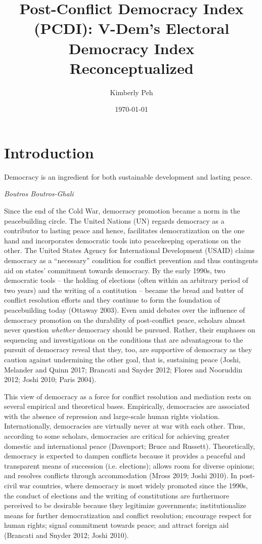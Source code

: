 \documentclass [11pt]{article}
\title{Post-Conflict Democracy Index (PCDI): V-Dem's Electoral Democracy Index Reconceptualized}
\author{Kimberly Peh}
\date{\today}
\begin{document}
\maketitle

\section*{Introduction} 

\epigraph{Democracy is an ingredient for both sustainable development and lasting peace.}{\emph{Boutros Boutros-Ghali}}

Since the end of the Cold War, democracy promotion became a norm in the peacebuilding circle. The United Nations (UN) regards democracy as a contributor to lasting peace and hence, facilitates democratization on the one hand and incorporates democratic tools into peacekeeping operations on the other. The United States Agency for International Development (USAID) claims democracy as a ``necessary'' condition for conflict prevention and thus contingents aid on states' commitment towards democracy. By the early 1990s, two democratic tools -- the holding of elections (often within an arbitrary period of two years) and the writing of a contitution -- became the bread and butter of conflict resolution efforts and they continue to form the foundation of peacebuilding today (Ottaway 2003). Even amid debates over the influence of democracy promotion on the durability of post-conflict peace, scholars almost never question \emph{whether} democracy should be pursued. Rather, their emphases on sequencing and investigations on the conditions that are advantageous to the pursuit of democracy reveal that they, too, are supportive of democracy as they caution against undermining the other goal, that is, sustaining peace (Joshi, Melander and Quinn 2017; Brancati and Snyder 2012; Flores and Nooruddin 2012; Joshi 2010; Paris 2004).

This view of democracy as a force for conflict resolution and mediation rests on several empirical and theoretical bases. Empirically, democracies are associated with the absence of repression and large-scale human rights violation. Internationally, democracies are virtually never at war with each other. Thus, according to some scholars, democracies are critical for achieving greater domestic and international peace (Davenport; Bruce and Russett). Theoretically, democracy is expected to dampen conflicts because it provides a peaceful and transparent means of succession (i.e. elections); allows room for diverse opinions; and resolves conflicts through accommodation (Mross 2019; Joshi 2010). In post-civil war countries, where democracy is most widely promoted since the 1990s, the conduct of elections and the writing of constitutions are furthermore perceived to be desirable because they legitimize governments; institutionalize means for further democratization and conflict resolution; encourage respect for human rights; signal commitment towards peace; and attract foreign aid (Brancati and Snyder 2012; Joshi 2010).
\end{document}
